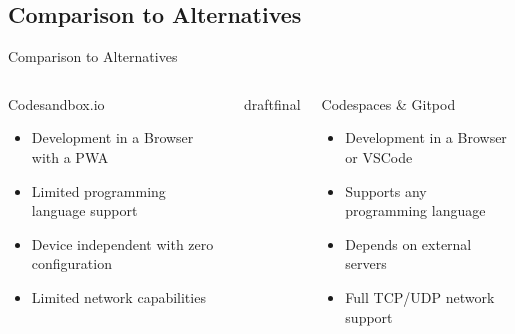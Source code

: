 \documentclass{beamer}
\def\final{final}
\def\status{draft}
\begin{document}
\subsection{Comparison to Alternatives}
\begin{frame}
  \vspace{-.7cm}
  \begin{center}
    \Large Comparison to Alternatives
  \end{center}
  \vspace{-0.2cm}
  \begin{columns}[totalwidth=\textwidth]
    \begin{column}{0.45\textwidth}
      \begin{center}
        {\large\color{uos-red-full}Codesandbox.io }
      \end{center}
      \begin{itemize}
        \setlength\itemsep{0.6em}
        \item Development in a Browser with a PWA
        \item Limited programming language support
        \item Device independent with zero configuration
        \item Limited network capabilities
      \end{itemize}
    \end{column}

    \ifx\status\final{}
      \pause{}
    \fi
    \hspace{1cm}

    \begin{column}{0.45\textwidth}
      \begin{center}
        {\large\color{uos-red-full}Codespaces \& Gitpod}
      \end{center}
      \begin{itemize}
        \setlength\itemsep{0.6em}
        \item Development in a Browser or VSCode
        \item Supports any programming language
        \item Depends on external servers
        \item Full TCP/UDP network support
      \end{itemize}
    \end{column}
  \end{columns}
\end{frame}
\end{document}

